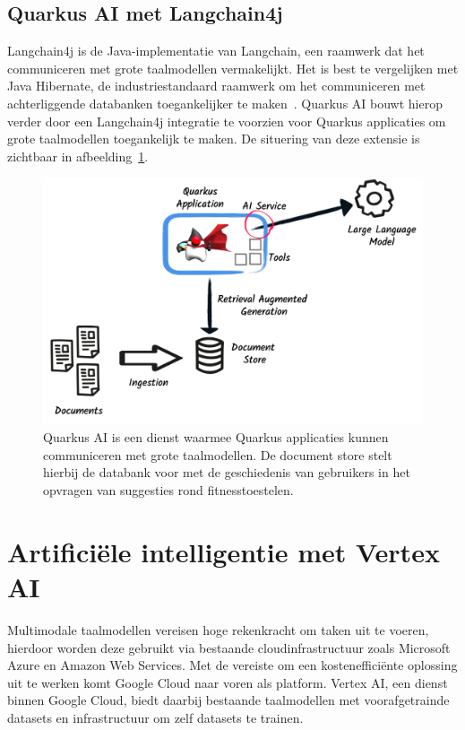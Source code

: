 \subsection{Quarkus AI met Langchain4j}
\label{subsec:quarkus-ai-met-langchain4j}
Langchain4j is de Java-implementatie van Langchain, een raamwerk dat het communiceren met grote taalmodellen vermakelijkt.
Het is best te vergelijken met Java Hibernate, de industriestandaard raamwerk om het communiceren met achterliggende databanken toegankelijker te maken~\autocite{Langchain4j}.
Quarkus AI bouwt hierop verder door een Langchain4j integratie te voorzien voor Quarkus applicaties om grote taalmodellen toegankelijk te maken.
De situering van deze extensie is zichtbaar in afbeelding~\ref{fig:quarkus-ai}.

\begin{figure}[H]
    \begin{center}
        \includegraphics[scale=0.45]{images/quarkus-ai-visualisation}
        \caption{Quarkus AI is een dienst waarmee Quarkus applicaties kunnen communiceren met grote taalmodellen. De document store stelt hierbij de databank voor met de geschiedenis van gebruikers in het opvragen van suggesties rond fitnesstoestelen.~\autocite{Lowe2004}}
        \label{fig:quarkus-ai}
    \end{center}
\end{figure}

\section{Artificiële intelligentie met Vertex AI}
\label{sec:keuze-ai-platform}
Multimodale taalmodellen vereisen hoge rekenkracht om taken uit te voeren, hierdoor worden deze gebruikt via bestaande cloudinfrastructuur zoals Microsoft Azure en Amazon Web Services.
Met de vereiste om een kostenefficiënte oplossing uit te werken komt Google Cloud naar voren als platform.
Vertex AI, een dienst binnen Google Cloud, biedt daarbij bestaande taalmodellen met voorafgetrainde datasets en infrastructuur om zelf datasets te trainen.

